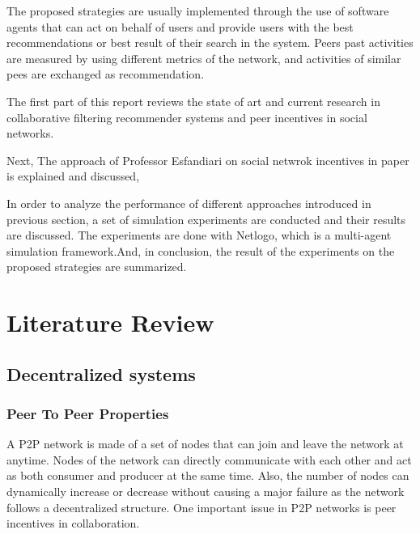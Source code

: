 \documentclass [12pt]{article} \usepackage{multicol}
\begin{document}
		The proposed strategies are usually implemented through the
	use of software agents that can act on behalf of users and
	provide users with the best recommendations or best result of
	their search in the system. Peers past activities are measured by
	using different metrics of the network, and activities of similar
	pees are exchanged as recommendation.


		The first part of this report reviews the state of art and
	current research in collaborative filtering recommender systems
	and peer incentives in social networks.

		Next, The approach of Professor Esfandiari on social netwrok
	incentives in paper is explained and discussed,

		In order to analyze the performance of different approaches
	introduced in previous section, a set of simulation experiments
	are conducted and their results are discussed. 
	The experiments are done with Netlogo, which is a
	multi-agent simulation framework.And, in conclusion, the result
	of the experiments on the proposed strategies are summarized.
		
				

\section{Literature Review}

\subsection{Decentralized systems}


	\subsubsection{Peer To Peer Properties} A P2P network is
	made of a set of nodes that can join and leave the
	network at anytime. Nodes of the network can directly communicate
	with each other and act as both consumer and producer at
	the same time. Also, the number of nodes can dynamically increase or
	decrease without causing a major failure as the network
	follows a decentralized structure. One important issue in P2P
	networks is peer incentives in collaboration.
	 
\end{document}
